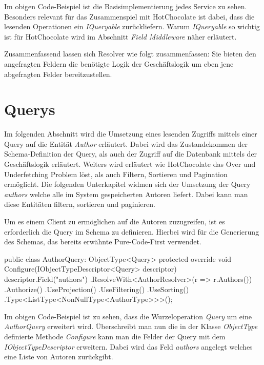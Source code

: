 Im obigen Code-Beispiel ist die Basisimplementierung jedes Service zu sehen.
Besonders relevant für das Zusammenspiel mit HotChocolate ist dabei, dass die lesenden Operationen ein \textit{IQueryable} zurückliefern.
Warum \textit{IQueryable} so wichtig ist für HotChocolate wird im Abschnitt \textit{Field Middleware} näher erläutert.
\newline

Zusammenfassend lassen sich Resolver wie folgt zusammenfassen: Sie bieten den angefragten Feldern die benötigte Logik der Geschäftslogik um eben jene abgefragten Felder bereitzustellen.

\section{Querys}
Im folgenden Abschnitt wird die Umsetzung eines lesenden Zugriffs mittels einer Query auf die Entität \textit{Author} erläutert.
Dabei wird das Zustandekommen der Schema-Definition der Query, als auch der Zugriff auf die Datenbank mittels der Geschäftslogik erläutert.
Weiters wird erläutert wie HotChocolate das Over und Underfetching Problem löst, als auch Filtern, Sortieren und Pagination ermöglicht.
\newline
Die folgenden Unterkapitel widmen sich der Umsetzung der Query \textit{authors} welche alle im System gespeicherten Autoren liefert.
Dabei kann man diese Entitäten filtern, sortieren und paginieren. %

Um es einem Client zu ermöglichen auf die Autoren zuzugreifen, ist es erforderlich die Query im Schema zu definieren.
Hierbei wird für die Generierung des Schemas, das bereits erwähnte Pure-Code-First verwendet.
\newline

\begin{JsCode}
public class AuthorQuery: ObjectType<Query> {
    protected override void Configure(IObjectTypeDescriptor<Query> descriptor) {
        descriptor.Field("authors")
            .ResolveWith<AuthorResolver>(r => r.Authors())
            .Authorize()
            .UseProjection()
            .UseFiltering()
            .UseSorting()
            .Type<ListType<NonNullType<AuthorType>>>();
    }
}
\end{JsCode}

Im obigen Code-Beispiel ist zu sehen, dass die Wurzeloperation \textit{Query} um eine \textit{AuthorQuery} erweitert wird.
Überschreibt man nun die in der Klasse \textit{ObjectType} definierte Methode \textit{Configure} kann man die Felder der Query mit dem \textit{IObjectTypeDescriptor} erweitern.
Dabei wird das Feld \textit{authors} angelegt welches eine Liste von Autoren zurückgibt.

